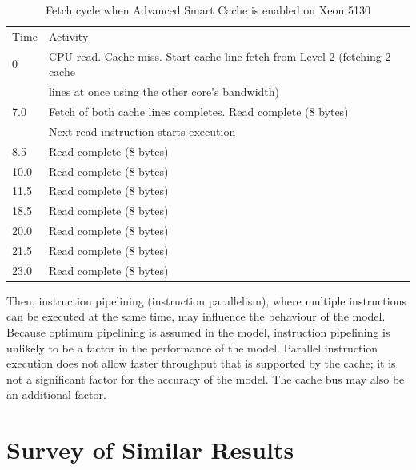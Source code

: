 \begin{table}[h]
\caption{Fetch cycle when Advanced Smart Cache is enabled on Xeon 5130}
\begin{tabular}{ll}
Time & Activity                                                                                 \\
0    & CPU read. Cache miss. Start cache line fetch from Level 2 (fetching 2 cache \\
 & lines at once using the other core's bandwidth)                   \\
7.0  & Fetch of both cache lines completes. Read complete (8 bytes)\\
 & Next read instruction starts execution \\
8.5  & Read complete (8 bytes)                                                                  \\
10.0 & Read complete (8 bytes)                                                                  \\
11.5 & Read complete (8 bytes)                                          \\
18.5 & Read complete (8 bytes) \\
20.0 & Read complete (8 bytes)                                                                  \\
21.5 & Read complete (8 bytes)                                                                  \\
23.0 & Read complete (8 bytes)                                                  
\end{tabular}
\label{prefetching3}
\end{table}

Then, instruction pipelining (instruction parallelism), where multiple instructions can be executed at the same time, may influence the behaviour of the model. Because optimum pipelining is assumed in the model, instruction pipelining is unlikely to be a factor in the performance of the model. Parallel instruction execution does not allow faster throughput that is supported by the cache; it is not a significant factor for the accuracy of the model. The cache bus may also be an additional factor.

\section{Survey of Similar Results}

